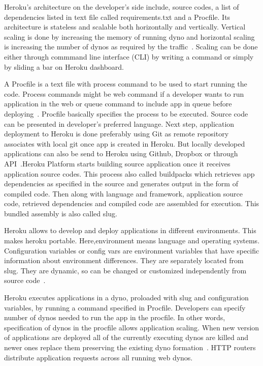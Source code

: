  Heroku's architecture on the developer's side include, source codes, a list of
 dependencies listed in text file called requirements.txt and a Procfile. Its
 architecture is stateless and scalable both horizontally and vertically.
 Vertical scaling is done by increasing the memory of running dyno and
 horizontal scaling is increasing the number of dynos as required by
 the traffic~\cite{hid-sp18-415-www-python-heroku-com}. Scaling can be done either
 through commmand line interface (CLI) by writing a command or simply
 by sliding a bar on Heroku dashboard. 

 A Procfile is a text file with 
 process command to be used to start running the code. Process commands might
 be web command if a developer wants to run application in the web or queue
 command to include app in queue before deploying~\cite{hid-sp18-415-www-how-heroku-works}.
 Procfile basically specifies the process to be executed.
 Source code can be presented in developer's preferred language.
 Next step, application deployment to Heroku is done preferably using Git
 as remote repository associates with local git  once app is created in Heroku.
 But locally developed applications can also be send to Heroku using Github,
 Dropbox or through API~\cite{hid-sp18-415-www-how-heroku-works}.Heroku Platform starts 
 building source application once it receives application source codes. This 
 process also called buildpacks which retrieves app dependencies as specified 
 in the source and generates output in the form of compiled code. Then along
 with language and framework, application source code, retrieved dependencies
 and compiled code are assembled for execution. This bundled assembly is also
 called slug.

 Heroku allows to develop and deploy applications in different environments.
 This makes heroku portable. Here,environment means language and operating
 systems. Configuration variables or config vars are environment variables
 that have specific information about environment differences. They are
 separately located from slug. They are dynamic, so can be changed or
 customized independently from source code~\cite{hid-sp18-415-www-how-heroku-works}.

 Heroku executes applications in a dyno, proloaded with slug and configuration
 variables, by running a command specified in Procfile. Developers can specify
 number of dynos needed to run the app in the procfile. In other words,
 specification of dynos in the procfile allows application scaling. When new
 version of applications are deployed all of the currently executing dynos are
 killed and newer ones replace them preserving the existing dyno
 formation~\cite{hid-sp18-415-www-how-heroku-works}. HTTP routers distribute application
 requests across all running web dynos. 


